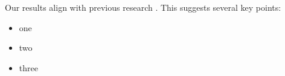\documentclass[stu,12pt,floatsintext]{apa7}
\begin{document}
Our results align with previous research \citep{mujtaba2023frc}. This suggests several key points:

\begin{itemize}
    \item one
    \item two
    \item three
\end{itemize}


\end{document}
